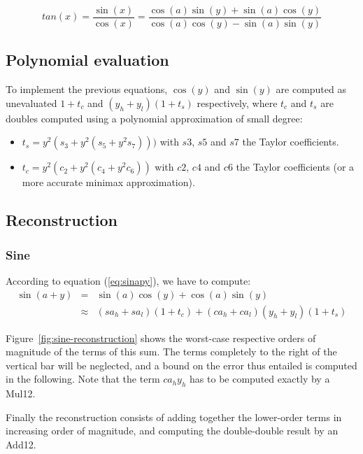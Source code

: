 \begin{equation} 
  tan(x) = \frac{\sin(x)}{\cos(x)} = \frac{\cos(a) \sin(y) +  \sin(a) \cos(y)}{\cos(a) \cos(y) -  \sin(a) \sin(y)}
  \label{eq:tanapy}
\end{equation}


\subsection{Polynomial evaluation}


To implement the previous equations, $\cos(y)$ and $\sin(y)$ are
computed as unevaluated $1+t_c$ and $(y_h+y_l)(1+t_s)$ respectively,
where $t_c$ and $t_s$ are doubles computed using a polynomial
approximation of small degree:

\begin{itemize}
\item $t_s = y^2(s_3 + y^2(s_5 + y^2s_7)))$ with $s3$, $s5$ and
$s7$ the Taylor coefficients.
\item $t_c = y^2(c_2 + y^2(c_4 + y^2c_6))$ with $c2$, $c4$ and $c6$ the
Taylor coefficients (or a more accurate minimax approximation).
\end{itemize}



\subsection{Reconstruction}

\subsubsection{Sine}
According to equation (\ref{eq:sinapy}), we have to compute: 
 \begin{eqnarray*}
  \sin(a+y) &=& \sin(a) \cos(y)  + \cos(a)\sin(y)  \\
  & \approx& (sa_h+sa_l)(1+t_c) + (ca_h+ca_l)(y_h+y_l)(1+t_s)
\end{eqnarray*}


Figure~\ref{fig:sine-reconstruction} shows the worst-case respective
orders of magnitude of the terms of this sum. The terms completely to the
right of the vertical bar will be neglected, and a bound on the
error thus entailed is computed in the following. Note that the term
$ca_hy_h$ has to be computed exactly by a Mul12.

Finally the reconstruction consists of adding together the lower-order
terms in increasing order of magnitude, and computing the
double-double result by an Add12.

